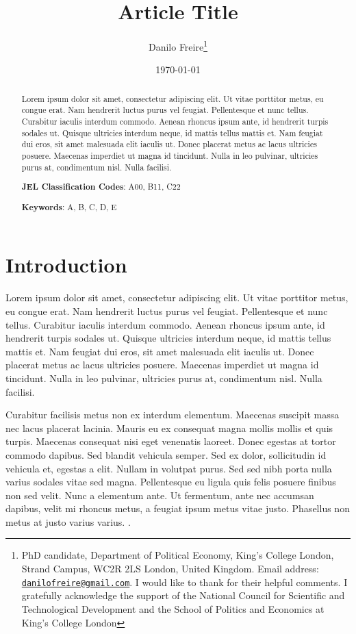 \documentclass[a4paper,12pt]{article}
\title{\textbf{Article Title}}
\author{Danilo Freire\thanks{PhD candidate, Department of Political Economy, King's College London, Strand Campus, WC2R 2LS London, United Kingdom. Email address: \href{mailto:danilofreire@gmail.com}{\texttt{danilofreire@gmail.com}}. I would like to thank for their helpful comments. I gratefully acknowledge the support of the National Council for Scientific and Technological Development and the School of Politics and Economics at King’s College London}
}
\date{\today}
\begin{document}
\maketitle

\begin{abstract}
 \noindent
 Lorem ipsum dolor sit amet, consectetur adipiscing elit. Ut vitae porttitor metus, eu congue erat. Nam hendrerit luctus purus vel feugiat. Pellentesque et nunc tellus. Curabitur iaculis interdum commodo. Aenean rhoncus ipsum ante, id hendrerit turpis sodales ut. Quisque ultricies interdum neque, id mattis tellus mattis et. Nam feugiat dui eros, sit amet malesuada elit iaculis ut. Donec placerat metus ac lacus ultricies posuere. Maecenas imperdiet ut magna id tincidunt. Nulla in leo pulvinar, ultricies purus at, condimentum nisl. Nulla facilisi.

 \vspace{.5cm}
 \noindent
 \textbf{JEL Classification Codes}: A00, B11, C22

 \vspace{.25cm}
 \noindent
 \textbf{Keywords}: A, B, C, D, E
\end{abstract}

\newpage

\section{Introduction}
\label{sec:intro}

Lorem ipsum dolor sit amet, consectetur adipiscing elit. Ut vitae porttitor metus, eu congue erat. Nam hendrerit luctus purus vel feugiat. Pellentesque et nunc tellus. Curabitur iaculis interdum commodo. Aenean rhoncus ipsum ante, id hendrerit turpis sodales ut. Quisque ultricies interdum neque, id mattis tellus mattis et. Nam feugiat dui eros, sit amet malesuada elit iaculis ut. Donec placerat metus ac lacus ultricies posuere. Maecenas imperdiet ut magna id tincidunt. Nulla in leo pulvinar, ultricies purus at, condimentum nisl. Nulla facilisi.

Curabitur facilisis metus non ex interdum elementum. Maecenas suscipit massa nec lacus placerat lacinia. Mauris eu ex consequat magna mollis mollis et quis turpis. Maecenas consequat nisi eget venenatis laoreet. Donec egestas at tortor commodo dapibus. Sed blandit vehicula semper. Sed ex dolor, sollicitudin id vehicula et, egestas a elit. Nullam in volutpat purus. Sed sed nibh porta nulla varius sodales vitae sed magna. Pellentesque eu ligula quis felis posuere finibus non sed velit. Nunc a elementum ante. Ut fermentum, ante nec accumsan dapibus, velit mi rhoncus metus, a feugiat ipsum metus vitae justo. Phasellus non metus at justo varius varius. \citetext{\citealp[71]{labronici2012paratodos}; \citealp[142]{misse2007illegal}}.
\end{document}
